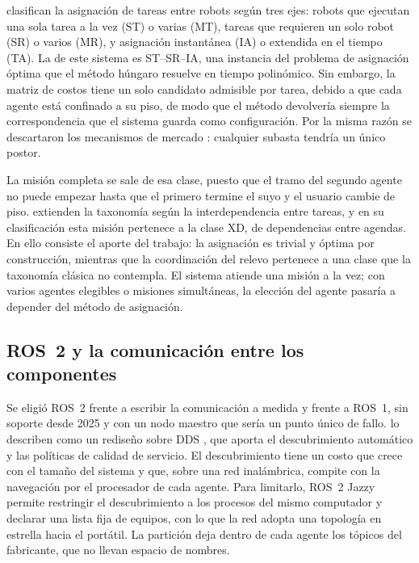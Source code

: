 \textcite{gerkey2004taxonomy} clasifican la asignación de tareas entre robots según tres ejes: robots que ejecutan una sola tarea a la vez (ST) o varias (MT), tareas que requieren un solo robot (SR) o varios (MR), y asignación instantánea (IA) o extendida en el tiempo (TA). La de este sistema es ST--SR--IA, una instancia del problema de asignación óptima que el método húngaro resuelve en tiempo polinómico. Sin embargo, la matriz de costos tiene un solo candidato admisible por tarea, debido a que cada agente está confinado a su piso, de modo que el método devolvería siempre la correspondencia que el sistema guarda como configuración. Por la misma razón se descartaron los mecanismos de mercado \autocite{quinton2023market}: cualquier subasta tendría un único postor.

La misión completa se sale de esa clase, puesto que el tramo del segundo agente no puede empezar hasta que el primero termine el suyo y el usuario cambie de piso. \textcite{korsah2013comprehensive} extienden la taxonomía según la interdependencia entre tareas, y en su clasificación esta misión pertenece a la clase XD, de dependencias entre agendas. En ello consiste el aporte del trabajo: la asignación es trivial y óptima por construcción, mientras que la coordinación del relevo pertenece a una clase que la taxonomía clásica no contempla. El sistema atiende una misión a la vez; con varios agentes elegibles o misiones simultáneas, la elección del agente pasaría a depender del método de asignación.

\subsection{ROS~2 y la comunicación entre los componentes}

Se eligió ROS~2 frente a escribir la comunicación a medida y frente a ROS~1, sin soporte desde 2025 y con un nodo maestro que sería un punto único de fallo. \textcite{macenski2022ros2} lo describen como un rediseño sobre DDS \autocite{omg2015dds}, que aporta el descubrimiento automático y las políticas de calidad de servicio. El descubrimiento tiene un costo que crece con el tamaño del sistema y que, sobre una red inalámbrica, compite con la navegación por el procesador de cada agente. Para limitarlo, ROS~2 Jazzy permite restringir el descubrimiento a los procesos del mismo computador y declarar una lista fija de equipos, con lo que la red adopta una topología en estrella hacia el portátil. La partición deja dentro de cada agente los tópicos del fabricante, que no llevan espacio de nombres.

